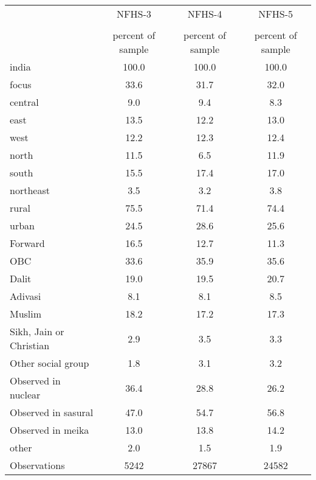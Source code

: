 {
\def\sym#1{\ifmmode^{#1}\else\(^{#1}\)\fi}
\begin{tabular}{l*{3}{c}}
\toprule
                    &      NFHS-3&      NFHS-4&      NFHS-5\\
                    &\multicolumn{1}{c}{}&\multicolumn{1}{c}{}&\multicolumn{1}{c}{}\\
                    &percent of sample&percent of sample&percent of sample\\
\midrule
india               &       100.0&       100.0&       100.0\\
focus               &        33.6&        31.7&        32.0\\
central             &         9.0&         9.4&         8.3\\
east                &        13.5&        12.2&        13.0\\
west                &        12.2&        12.3&        12.4\\
north               &        11.5&         6.5&        11.9\\
south               &        15.5&        17.4&        17.0\\
northeast           &         3.5&         3.2&         3.8\\
rural               &        75.5&        71.4&        74.4\\
urban               &        24.5&        28.6&        25.6\\
Forward             &        16.5&        12.7&        11.3\\
OBC                 &        33.6&        35.9&        35.6\\
Dalit               &        19.0&        19.5&        20.7\\
Adivasi             &         8.1&         8.1&         8.5\\
Muslim              &        18.2&        17.2&        17.3\\
Sikh, Jain or Christian&         2.9&         3.5&         3.3\\
Other social group  &         1.8&         3.1&         3.2\\
Observed in nuclear &        36.4&        28.8&        26.2\\
Observed in sasural &        47.0&        54.7&        56.8\\
Observed in meika   &        13.0&        13.8&        14.2\\
other               &         2.0&         1.5&         1.9\\
\midrule
Observations        &        5242&       27867&       24582\\
\bottomrule
\end{tabular}
}
